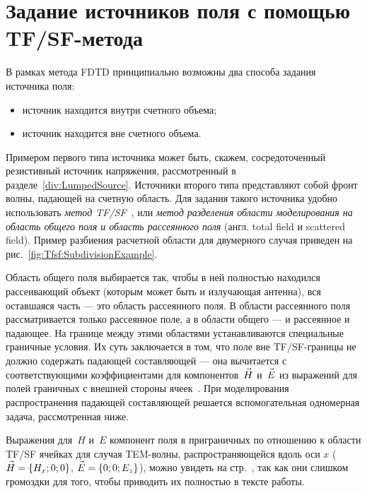%
%
%
\section{Задание источников поля с помощью TF/SF-метода}

В рамках метода FDTD принципиально возможны два способа задания источника поля:
\begin{itemize}
\item источник находится внутри счетного объема;
\item источник находится вне счетного объема.
\end{itemize}
Примером первого типа источника может быть, скажем, сосредоточенный резистивный
источник напряжения, рассмотренный в разделе~\ref{div:LumpedSource}. Источники
второго типа представляют собой фронт волны, падающей на счетную область. Для
задания такого источника удобно использовать
\emph{метод TF/SF}~\cite{bib:Taflove1995,bib:Davidson2005,bib:Berenger1994,
bib:Berenger1996}, или \emph{метод разделения области моделирования на область
общего поля и область рассеянного поля} (англ. total field и scattered field).
Пример разбиения расчетной области для двумерного случая приведен на
рис.~\ref{fig:Tfsf:SubdivisionExample}.

Область общего поля выбирается так, чтобы в ней полностью находился рассеивающий
объект (которым может быть и излучающая антенна), вся оставшаяся часть --- это
область рассеянного поля. В области рассеянного поля рассматривается только
рассеянное поле, а в области общего --- и рассеянное и падающее. На границе
между этими областями устанавливаются специальные граничные условия. Их суть
заключается в том, что поле вне TF/SF-границы не должно содержать падающей
составляющей --- она вычитается с соответствующими коэффициентами для
компонентов~$\vec{H\mathstrut}$ и~$\vec{E\mathstrut}$ из выражений для полей граничных с внешней
стороны ячеек~\cite{bib:Bogolyubov2006}. При моделирования распространения
падающей составляющей решается вспомогательная одномерная задача, рассмотренная
ниже.

Выражения для~$H$ и~$E$ компонент поля в приграничных по отношению к области
TF/SF ячейках для случая TEM-волны, распространяющейся вдоль оси $x$
($\vec{H\mathstrut}=\{H_x;0;0\}$, $\vec{E\mathstrut}=\{0;0;E_z\}$), можно увидеть на
стр.~\pageref{eq:Tfsf:BasicEquationsOnSeparatePage}, так как они слишком
громоздки для того, чтобы приводить их полностью в тексте работы.

